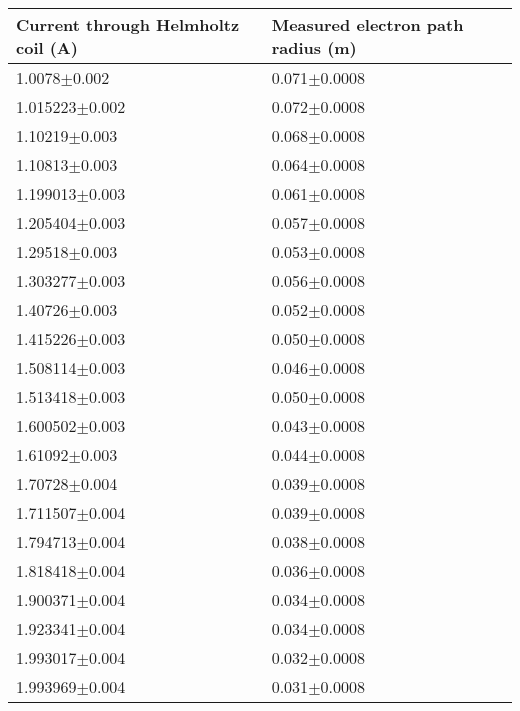 \begin{tabular}{|p{} | p{} | }
\hline
Current through Helmholtz coil (A) & Measured electron path radius (m)\\
\hline
1.0078$\pm$0.002&0.071$\pm$0.0008\\
1.015223$\pm$0.002&0.072$\pm$0.0008\\
1.10219$\pm$0.003&0.068$\pm$0.0008\\
1.10813$\pm$0.003&0.064$\pm$0.0008\\
1.199013$\pm$0.003&0.061$\pm$0.0008\\
1.205404$\pm$0.003&0.057$\pm$0.0008\\
1.29518$\pm$0.003&0.053$\pm$0.0008\\
1.303277$\pm$0.003&0.056$\pm$0.0008\\
1.40726$\pm$0.003&0.052$\pm$0.0008\\
1.415226$\pm$0.003&0.050$\pm$0.0008\\
1.508114$\pm$0.003&0.046$\pm$0.0008\\
1.513418$\pm$0.003&0.050$\pm$0.0008\\
1.600502$\pm$0.003&0.043$\pm$0.0008\\
1.61092$\pm$0.003&0.044$\pm$0.0008\\
1.70728$\pm$0.004&0.039$\pm$0.0008\\
1.711507$\pm$0.004&0.039$\pm$0.0008\\
1.794713$\pm$0.004&0.038$\pm$0.0008\\
1.818418$\pm$0.004&0.036$\pm$0.0008\\
1.900371$\pm$0.004&0.034$\pm$0.0008\\
1.923341$\pm$0.004&0.034$\pm$0.0008\\
1.993017$\pm$0.004&0.032$\pm$0.0008\\
1.993969$\pm$0.004&0.031$\pm$0.0008\\
\hline
\end{tabular}
